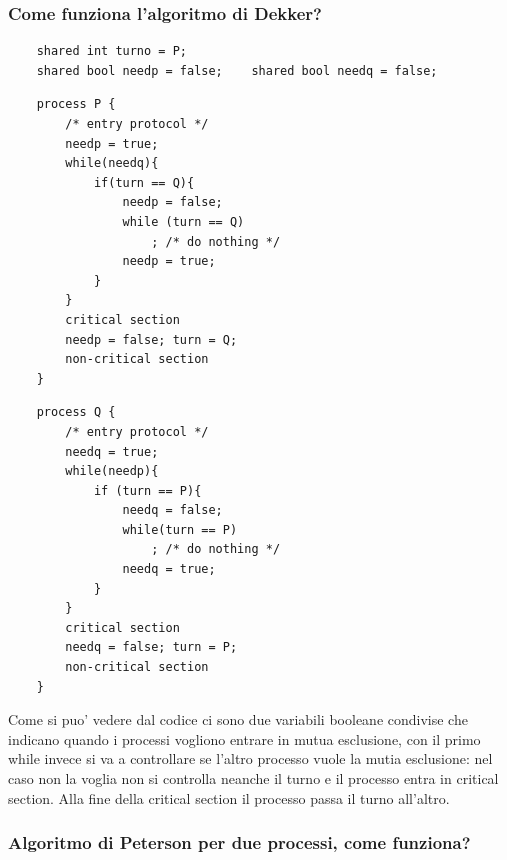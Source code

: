 \documentclass{article}
\begin{document}
\subsubsection{Come funziona l'algoritmo di Dekker?}
\begin{verbatim}
    shared int turno = P;
    shared bool needp = false;    shared bool needq = false;
\end{verbatim}
\vspace{0.15cm}
\noindent
\begin{minipage}[t]{0.48\textwidth}
    \begin{verbatim}
    process P {
        /* entry protocol */
        needp = true;
        while(needq){
            if(turn == Q){
                needp = false;
                while (turn == Q)
                    ; /* do nothing */
                needp = true;
            }
        }
        critical section
        needp = false; turn = Q;
        non-critical section
    }
\end{verbatim}
\end{minipage}%
\hfill
\begin{minipage}[t]{0.48\textwidth}
    \begin{verbatim}
    process Q {
        /* entry protocol */
        needq = true;
        while(needp){
            if (turn == P){
                needq = false;
                while(turn == P)
                    ; /* do nothing */
                needq = true;
            }
        }
        critical section
        needq = false; turn = P;
        non-critical section
    }
\end{verbatim}
\end{minipage}

Come si puo' vedere dal codice ci sono due variabili booleane condivise che
indicano quando i processi vogliono entrare in mutua esclusione, con il primo
while invece si va a controllare se l'altro processo vuole la mutia esclusione:
nel caso non la voglia non si controlla neanche il turno e il processo entra in
critical section. Alla fine della critical section il processo passa il turno
all'altro.

\subsubsection{Algoritmo di Peterson per due processi, come funziona?}
\end{document}
